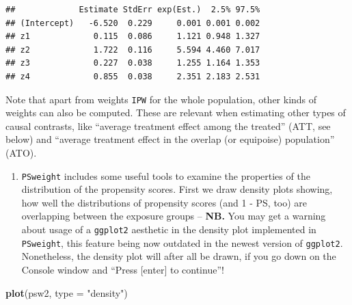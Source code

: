 \documentclass[
]{book}
\newenvironment{Shaded}{\begin{snugshade}}{\end{snugshade}}
\newcommand{\AttributeTok}[1]{\textcolor[rgb]{0.13,0.29,0.53}{#1}}
\newcommand{\FunctionTok}[1]{\textcolor[rgb]{0.13,0.29,0.53}{\textbf{#1}}}
\newcommand{\NormalTok}[1]{#1}
\newcommand{\OtherTok}[1]{\textcolor[rgb]{0.56,0.35,0.01}{#1}}
\newcommand{\SpecialCharTok}[1]{\textcolor[rgb]{0.81,0.36,0.00}{\textbf{#1}}}
\newcommand{\StringTok}[1]{\textcolor[rgb]{0.31,0.60,0.02}{#1}}
\providecommand{\tightlist}{%
  \setlength{\itemsep}{0pt}\setlength{\parskip}{0pt}}
\theoremstyle{definition}
\theoremstyle{definition}
\theoremstyle{definition}
\theoremstyle{definition}
\theoremstyle{remark}
\begin{document}
\begin{verbatim}
##             Estimate StdErr exp(Est.)  2.5% 97.5%
## (Intercept)   -6.520  0.229     0.001 0.001 0.002
## z1             0.115  0.086     1.121 0.948 1.327
## z2             1.722  0.116     5.594 4.460 7.017
## z3             0.227  0.038     1.255 1.164 1.353
## z4             0.855  0.038     2.351 2.183 2.531
\end{verbatim}

\begin{Shaded}
\end{Shaded}

Note that apart from weights \texttt{IPW} for the whole population, other kinds
of weights can also be computed. These are relevant when estimating
other types of causal contrasts, like ``average treatment effect among
the treated'' (ATT, see below) and ``average treatment effect in the
overlap (or equipoise) population'' (ATO).

\begin{enumerate}
\def\labelenumi{\arabic{enumi}.}
\setcounter{enumi}{1}
\tightlist
\item
  \texttt{PSweight} includes some useful tools to examine the properties of
  the distribution of the propensity scores. First we draw density
  plots showing, how well the distributions of propensity scores (and
  1 - PS, too) are overlapping between the exposure groups -- \textbf{NB.}
  You may get a warning about usage of a
  \texttt{ggplot2} aesthetic in the density plot implemented in \texttt{PSweight},
  this feature being now outdated in the newest version of \texttt{ggplot2}.
  Nonetheless, the density plot will after all be drawn, if you go
  down on the Console window and ``Press {[}enter{]} to continue''!
\end{enumerate}

\begin{Shaded}
\begin{Highlighting}[]
\FunctionTok{plot}\NormalTok{(psw2, }\AttributeTok{type =} \StringTok{"density"}\NormalTok{)}
\end{Highlighting}
\end{Shaded}
\end{document}
